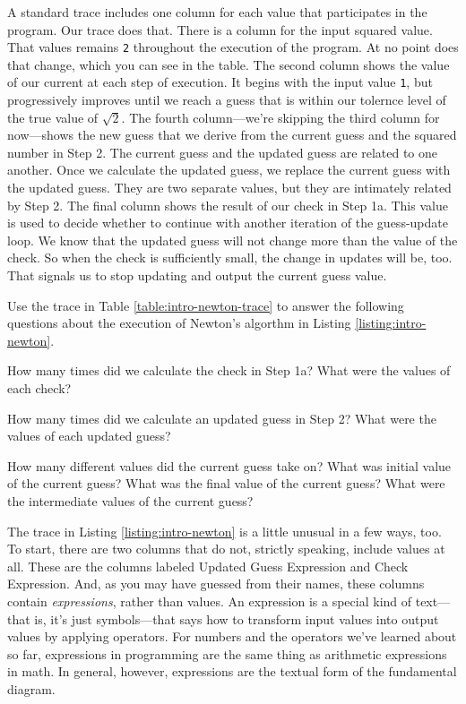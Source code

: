 A standard trace includes one column for each value that participates in the program. Our trace does that. There is a column for the input squared value. That values remains \texttt{2} throughout the execution of the program. At no point does that change, which you can see in the table. The second column shows the value of our current at each step of execution. It begins with the input value \texttt{1}, but progressively improves until we reach a guess that is within our tolernce level of the true value of $\sqrt{2}$. The fourth column---we're skipping the third column for now---shows the new guess that we derive from the current guess and the squared number in Step 2. The current guess and the updated guess are related to one another. Once we calculate the updated guess, we replace the current guess with the updated guess. They are two separate values, but they are intimately related by Step 2. The final column shows the result of our check in Step 1a. This value is used to decide whether to continue with another iteration of the guess-update loop. We know that the updated guess will not change more than the value of the check. So when the check is sufficiently small, the change in updates will be, too. That signals us to stop updating and output the current guess value.

Use the trace in Table \ref{table:intro-newton-trace} to answer the following questions about the execution of Newton's algorthm in Listing \ref{listing:intro-newton}.
\begin{question}
  How many times did we calculate the check in Step 1a? What were the values of each check?
\end{question}

\begin{question}
  How many times did we calculate an updated guess in Step 2? What were the values of each updated guess?
\end{question}

\begin{question}
  How many different values did the current guess take on? What was initial value of the current guess? What was the final value of the current guess? What were the intermediate values of the current guess?
\end{question}

The trace in Listing \ref{listing:intro-newton} is a little unusual in a few ways, too. To start, there are two columns that do not, strictly speaking, include values at all. These are the columns labeled Updated Guess Expression and Check Expression. And, as you may have guessed from their names, these columns contain \emph{expressions}, rather than values. An expression is a special kind of text---that is, it's just symbols---that says how to transform input values into output values by applying operators. For numbers and the operators we've learned about so far, expressions in programming are the same thing as arithmetic expressions in math. In general, however, expressions are the textual form of the fundamental diagram.

